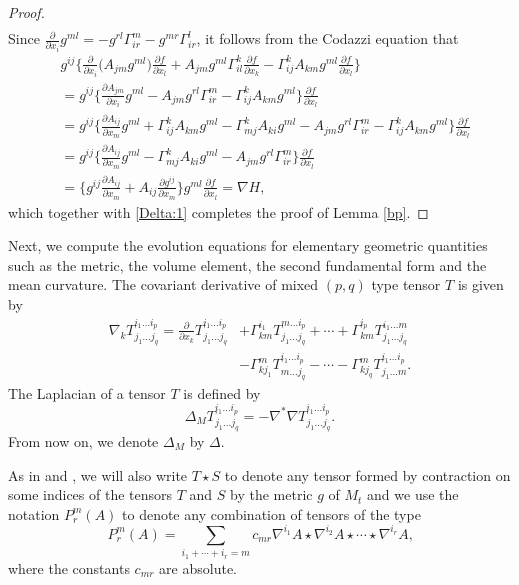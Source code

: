 \documentclass{amsart}
\theoremstyle{definition}
\numberwithin{equation}{section}
\begin{document}
\begin{proof}
\begin{align}
\end{align}
Since
$\frac{\partial }{\partial
x_i}g^{ml}=-g^{rl}\Gamma_{ir}^m-g^{mr}\Gamma_{ir}^l$, it follows
from the Codazzi equation that
\begin{align}
&g^{ij}\Big\{\frac{\partial}{\partial
x_i}\big(A_{jm}g^{ml}\big)\frac{\partial f}{\partial
x_l}+A_{jm}g^{ml}\Gamma_{il}^k\frac{\partial f}{\partial
x_k}-\Gamma_{ij}^k A_{km}g^{ml}\frac{\partial f}{\partial x_l}
\Big\}\nonumber\\
&=g^{ij}\Big\{\frac{\partial A_{jm}}{\partial
x_i}g^{ml}-A_{jm}g^{rl}\Gamma_{ir}^m-\Gamma_{ij}^k
A_{km}g^{ml}\Big\}\frac{\partial f}{\partial x_l}
\nonumber\\
&=g^{ij}\Big\{\frac{\partial A_{ij}}{\partial
x_m}g^{ml}+\Gamma_{ij}^k A_{km}g^{ml}-\Gamma_{mj}^k
A_{ki}g^{ml}-A_{jm}g^{rl}\Gamma_{ir}^m -\Gamma_{ij}^k A_{km}g^{ml}\Big\}\frac{\partial f}{\partial
x_l}\nonumber\\
&=g^{ij}\Big\{\frac{\partial A_{ij}}{\partial
x_m}g^{ml}-\Gamma_{mj}^k
A_{ki}g^{ml}-A_{jm}g^{rl}\Gamma_{ir}^m\Big\}\frac{\partial
f}{\partial x_l}\nonumber\\
&=\Big\{g^{ij}\frac{\partial A_{ij}}{\partial
x_m}+A_{ij}\frac{\partial g^{ij}}{\partial
x_m}\Big\}g^{ml}\frac{\partial f}{\partial
x_l}=\nabla H,\nonumber
\end{align}
which together with \eqref{Delta:1} completes the proof of Lemma \ref{bp}.
\end{proof}






Next, we compute the evolution equations for elementary
geometric quantities such as the metric, the volume element, the
second fundamental form and the mean curvature.
The covariant derivative  of mixed $(p, q)$ type tensor $T$ is given
by
\begin{align}
\nabla_k T^{i_1\ldots i_p}_{j_1\ldots j_q}=\frac{\partial }{\partial
x_k}T^{i_1\ldots i_p}_{j_1\ldots j_q}&+\Gamma_{km}^{i_1}T^{m\ldots
i_p}_{j_1\ldots j_q}+\cdots+\Gamma_{km}^{i_p}T^{i_1\ldots
m}_{j_1\ldots j_q}\nonumber\\
&-\Gamma_{kj_1}^{m}T^{i_1\ldots i_p}_{m\ldots
j_q}-\cdots-\Gamma_{kj_q}^{m}T^{i_1\ldots i_p}_{j_1\ldots
m}\nonumber.
\end{align}
The Laplacian of a tensor $T$ is defined by
\[\Delta_M T^{i_1\ldots i_p}_{j_1\ldots j_q}=-
\nabla^*\nabla  T^{i_1\ldots i_p}_{j_1\ldots j_q}.\]
From now on,    we denote $\Delta_M$ by $\Delta $.

  As in \cite{Ha} and \cite{KS1}, we will also write $T \star S$ to denote any tensor
formed by contraction on some indices of the tensors $T$ and $S$ by
the metric $g$ of $M_{t}$ and we use the notation $P_{r}^{m}\left( A
\right)$ to denote any combination of tensors of the type
$$P_{r}^{m}\left( A \right) = \sum_{i_{1}+ \cdots + i_{r}=m}c_{mr}
\nabla^{i_{1}} A \star \nabla^{i_{2}} A \star \cdots \star
\nabla^{i_{r}} A \mbox{,}$$ where the constants $c_{mr}$ are
absolute.
\end{document}
